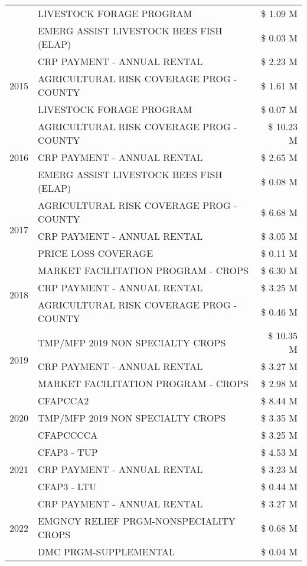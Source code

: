 \begin{tabular}{llr}
 & LIVESTOCK FORAGE PROGRAM & \$ 1.09 M \\
 & EMERG ASSIST LIVESTOCK BEES FISH (ELAP) & \$ 0.03 M \\
\cline{1-3}
\multirow[t]{3}{*}{2015} & CRP PAYMENT - ANNUAL RENTAL & \$ 2.23 M \\
 & AGRICULTURAL RISK COVERAGE PROG - COUNTY & \$ 1.61 M \\
 & LIVESTOCK FORAGE PROGRAM & \$ 0.07 M \\
\cline{1-3}
\multirow[t]{3}{*}{2016} & AGRICULTURAL RISK COVERAGE PROG - COUNTY & \$ 10.23 M \\
 & CRP PAYMENT - ANNUAL RENTAL & \$ 2.65 M \\
 & EMERG ASSIST LIVESTOCK BEES FISH (ELAP) & \$ 0.08 M \\
\cline{1-3}
\multirow[t]{3}{*}{2017} & AGRICULTURAL RISK COVERAGE PROG - COUNTY & \$ 6.68 M \\
 & CRP PAYMENT - ANNUAL RENTAL & \$ 3.05 M \\
 & PRICE LOSS COVERAGE & \$ 0.11 M \\
\cline{1-3}
\multirow[t]{3}{*}{2018} & MARKET FACILITATION PROGRAM - CROPS & \$ 6.30 M \\
 & CRP PAYMENT - ANNUAL RENTAL & \$ 3.25 M \\
 & AGRICULTURAL RISK COVERAGE PROG - COUNTY & \$ 0.46 M \\
\cline{1-3}
\multirow[t]{3}{*}{2019} & TMP/MFP 2019 NON SPECIALTY CROPS & \$ 10.35 M \\
 & CRP PAYMENT - ANNUAL RENTAL & \$ 3.27 M \\
 & MARKET FACILITATION PROGRAM - CROPS & \$ 2.98 M \\
\cline{1-3}
\multirow[t]{3}{*}{2020} & CFAPCCA2 & \$ 8.44 M \\
 & TMP/MFP 2019 NON SPECIALTY CROPS & \$ 3.35 M \\
 & CFAPCCCCA & \$ 3.25 M \\
\cline{1-3}
\multirow[t]{3}{*}{2021} & CFAP3 - TUP & \$ 4.53 M \\
 & CRP PAYMENT - ANNUAL RENTAL & \$ 3.23 M \\
 & CFAP3 - LTU & \$ 0.44 M \\
\cline{1-3}
\multirow[t]{3}{*}{2022} & CRP PAYMENT - ANNUAL RENTAL & \$ 3.27 M \\
 & EMGNCY RELIEF PRGM-NONSPECIALITY CROPS & \$ 0.68 M \\
 & DMC PRGM-SUPPLEMENTAL & \$ 0.04 M \\
\cline{1-3}
\bottomrule
\end{tabular}

